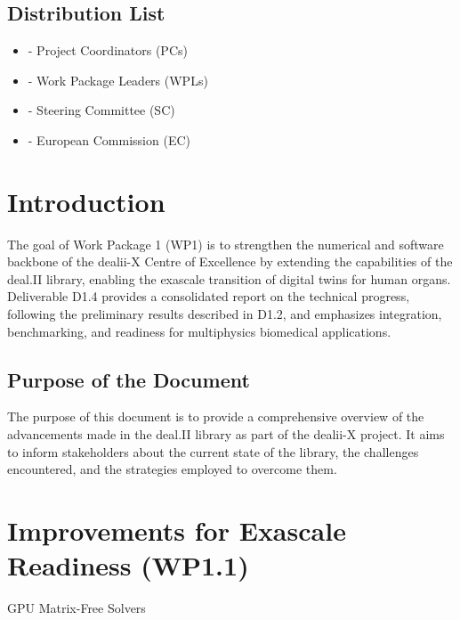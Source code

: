 \documentclass[a4paper,12pt]{article}
\begin{document}
\subsection*{{Distribution List}}
\begin{itemize}
    \item [] - Project Coordinators (PCs)
    \item [] - Work Package Leaders (WPLs)
    \item [] - Steering Committee (SC)
    \item [] - European Commission (EC)
\end{itemize}

\vspace*{2cm}

\disclaimer

\newpage

\tableofcontents %

\newpage

\section{{Introduction}}

The goal of Work Package 1 (WP1) is to strengthen the numerical and software backbone of the dealii-X Centre of Excellence by extending the capabilities of the deal.II library, enabling the exascale transition of digital twins for human organs. Deliverable D1.4 provides a consolidated report on the technical progress, following the preliminary results described in D1.2, and emphasizes integration, benchmarking, and readiness for multiphysics biomedical applications.

\subsection{{Purpose of the Document}}

The purpose of this document is to provide a comprehensive overview of the advancements made in the deal.II library as part of the dealii-X project. It aims to inform stakeholders about the current state of the library, the challenges encountered, and the strategies employed to overcome them.

\section{Improvements for Exascale Readiness (WP1.1)}
\label{sec:section2}
GPU Matrix-Free Solvers
\end{document}
